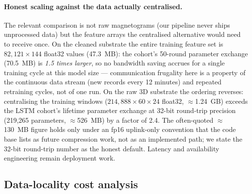 \paragraph{Honest scaling against the data actually centralised.}
The relevant comparison is not raw magnetograms (our pipeline never
ships unprocessed data) but the feature arrays the centralised
alternative would need to receive once. On the cleaned substrate the
entire training feature set is $82{,}121 \times 144$ float32 values
(47.3~MB): the cohort's 50-round parameter exchange (70.5~MB) is
\emph{1.5 times larger}, so no bandwidth saving accrues for a single
training cycle at this model size --- communication frugality here is
a property of the continuous data stream (new records every
12 minutes) and repeated
retraining cycles, not of one run. On the raw 3D substrate the
ordering reverses: centralising the training windows
($214{,}888 \times 60 \times 24$ float32, $\approx$1.24~GB) exceeds
the LSTM cohort's lifetime parameter exchange at 32-bit round-trip
precision (219{,}265 parameters, $\approx$526~MB) by a factor of
2.4. The often-quoted $\approx$130~MB figure holds only under an
fp16 uplink-only convention that the code base lists as future
compression work, not as an implemented path; we state the
32-bit round-trip number as the honest default. Latency and
availability engineering remain deployment work.

\subsection{Data-locality cost analysis}

